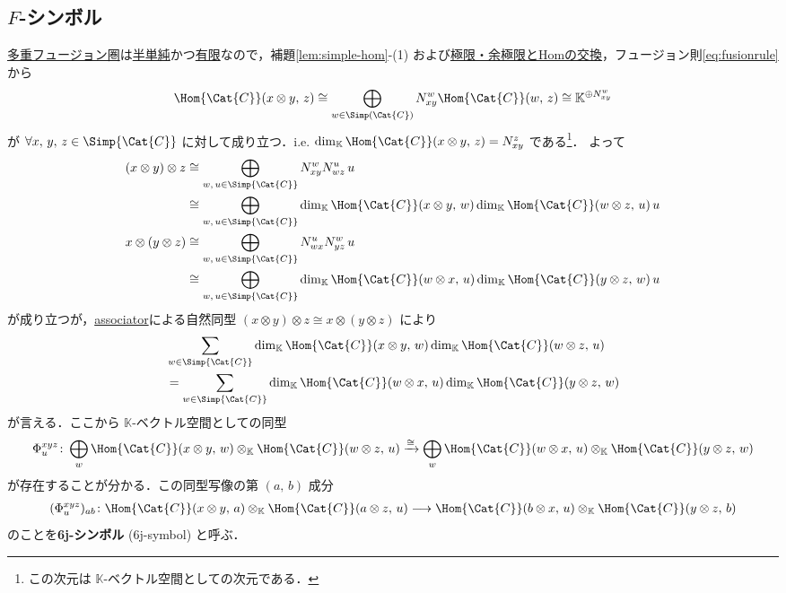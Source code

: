 \documentclass[TQFT_main]{subfiles}
\begin{document}
\subsection{$F$-シンボル}

\hyperref[def:tensorfusion-cat]{多重フュージョン圏}は\hyperref[def:semisimple-cat]{半単純}かつ\hyperref[def:finite-abcat]{有限}なので，補題\ref{lem:simple-hom}-(1) および\hyperref[prop:lim-colim-basic]{極限・余極限とHomの交換}，フュージョン則\eqref{eq:fusionrule}から
\begin{align}
    \Hom{\Cat{C}} (x \otimes y,\, z) \cong \bigoplus_{w \in \Simp(\Cat{C})} N^w_{xy} \Hom{\Cat{C}}(w,\, z) \cong \mathbb{K}^{\oplus N^w_{xy}}
\end{align}
が $\forall x,\, y,\, z \in \Simp{\Cat{C}}$ に対して成り立つ．i.e. $\dim_{\mathbb{K}} \Hom{\Cat{C}} (x \otimes y,\, z) = N^z_{xy}$ である\footnote{この次元は $\mathbb{K}$-ベクトル空間としての次元である．}．
よって
\begin{align}
    (x \otimes y) \otimes z &\cong \bigoplus_{w,\, u \in \Simp{\Cat{C}}} N^w_{xy} N^{u}_{wz}\, u \\
    &\cong \bigoplus_{w,\, u \in \Simp{\Cat{C}}} \dim_{\mathbb{K}}\Hom{\Cat{C}} (x \otimes y,\, w) \dim_{\mathbb{K}}\Hom{\Cat{C}} (w \otimes z,\, u)\, u \\
    x \otimes (y \otimes z) &\cong \bigoplus_{w,\, u \in \Simp{\Cat{C}}} N^{u}_{wx} N^w_{yz}\, u \\
    &\cong \bigoplus_{w,\, u \in \Simp{\Cat{C}}}  \dim_{\mathbb{K}}\Hom{\Cat{C}} (w \otimes x,\, u) \dim_{\mathbb{K}}\Hom{\Cat{C}} (y \otimes z,\, w)\, u
\end{align}
が成り立つが，\hyperref[redef:monoidal-category]{associator}による自然同型 $(x \otimes y) \otimes z \cong x \otimes (y \otimes z)$ により
\begin{align}
    &\sum_{w \in \Simp{\Cat{C}}} \dim_{\mathbb{K}}\Hom{\Cat{C}} (x \otimes y,\, w) \dim_{\mathbb{K}}\Hom{\Cat{C}} (w \otimes z,\, u) \\
    &= \sum_{w \in \Simp{\Cat{C}}} \dim_{\mathbb{K}}\Hom{\Cat{C}} (w \otimes x,\, u) \dim_{\mathbb{K}}\Hom{\Cat{C}} (y \otimes z,\, w)
\end{align}
が言える．ここから $\mathbb{K}$-ベクトル空間としての同型
\begin{align}
    \label{eq:6j}
    \Phi^{xyz}_{u} \colon \bigoplus_{w} \Hom{\Cat{C}} (x \otimes y,\, w) \otimes_{\mathbb{K}} \Hom{\Cat{C}} (w \otimes z,\, u) \xrightarrow{\cong} \bigoplus_{w} \Hom{\Cat{C}} (w \otimes x,\, u) \otimes_{\mathbb{K}} \Hom{\Cat{C}} (y \otimes z,\, w)
\end{align}
が存在することが分かる．この同型写像の第 $(a,\, b)$ 成分
\begin{align}
    \label{def:6j-symbol}
    (\Phi^{xyz}_u)_{ab} \colon \Hom{\Cat{C}} (x \otimes y,\, a) \otimes_{\mathbb{K}} \Hom{\Cat{C}} (a \otimes z,\, u) \lto \Hom{\Cat{C}} (b\otimes x,\, u) \otimes_{\mathbb{K}} \Hom{\Cat{C}} (y \otimes z,\, b)
\end{align}
のことを\textbf{6j-シンボル} (6j-symbol) と呼ぶ．
\end{document}
